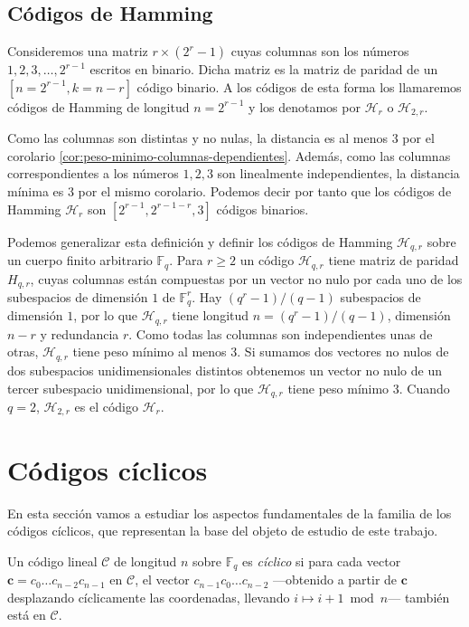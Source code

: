 \subsection{Códigos de Hamming}

Consideremos una matriz \(r \times (2^r - 1)\) cuyas columnas son los números \(1, 2, 3, \dots, 2^{r-1}\) escritos en binario. 
Dicha matriz es la matriz de paridad de un \([n=2^{r-1}, k=n-r]\) código binario.
A los códigos de esta forma los llamaremos códigos de Hamming de longitud \(n = 2^{r-1}\) y los denotamos por \(\mathcal H_r\) o \(\mathcal H_{2,r}\).

Como las columnas son distintas y no nulas, la distancia es al menos \(3\) por el corolario \ref{cor:peso-minimo-columnas-dependientes}.
Además, como las columnas correspondientes a los números \(1, 2, 3\) son linealmente independientes, la distancia mínima es 3 por el mismo corolario.
Podemos decir por tanto que los códigos de Hamming \(\mathcal H_r\) son \([2^{r-1}, 2^{r-1-r}, 3]\) códigos binarios.

Podemos generalizar esta definición y definir los códigos de Hamming \(\mathcal H_{q,r}\) sobre un cuerpo finito arbitrario \(\mathbb F_q\). 
Para \(r \geq 2\) un código \(\mathcal H_{q,r}\) tiene matriz de paridad \(H_{q,r}\), cuyas columnas están compuestas por un vector no nulo por cada uno de los subespacios de dimensión \(1\) de \(\mathbb F_q^r\).
Hay \((q^r-1)/(q-1)\) subespacios de dimensión \(1\), por lo que \(\mathcal H_{q,r}\) tiene longitud \(n = (q^r-1)/(q-1)\), dimensión \(n-r\) y redundancia \(r\).
Como todas las columnas son independientes unas de otras, \(\mathcal H_{q,r}\) tiene peso mínimo al menos 3.
Si sumamos dos vectores no nulos de dos subespacios unidimensionales distintos obtenemos un vector no nulo de un tercer subespacio unidimensional, por lo que \(\mathcal H_{q,r}\) tiene peso mínimo 3. 
Cuando \(q = 2\), \(\mathcal H_{2,r}\) es el código \(\mathcal H_r\).


\section{Códigos cíclicos}

En esta sección vamos a estudiar los aspectos fundamentales de la familia de los códigos cíclicos, que representan la base del objeto de estudio de este trabajo.

\begin{definition}
  Un código lineal \(\mathcal C\) de longitud \(n\) sobre \(\mathbb F_q\) es \textit{cíclico} si para cada vector \(\mathbf c = c_0\dots c_{n-2}c_{n-1}\) en \(\mathcal C\), el vector \(c_{n-1}c_0\dots c_{n-2}\) —obtenido a partir de \(\mathbf c\) desplazando cíclicamente las coordenadas, llevando \(i \mapsto i +1 \bmod n\)— también está en \(\mathcal C\).
\end{definition}

